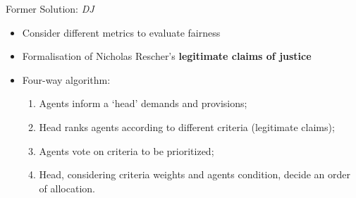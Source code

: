 \begin{frame}{Former Solution: \emph{DJ}}

\begin{itemize}
\item
  Consider different metrics to evaluate fairness
\item
  Formalisation of Nicholas Rescher's \textbf{legitimate claims of
  justice}
\end{itemize}

\columnsbegin


\begin{figure}
  \centering
\end{figure}


\begin{itemize}
\tightlist
\item
  Four-way algorithm:

  \begin{enumerate}
  \def\labelenumi{\arabic{enumi}.}
  \tightlist
  \item
    Agents inform a `head' demands and provisions;
  \item
    Head ranks agents according to different criteria (legitimate
    claims);
  \item
    Agents vote on criteria to be prioritized;
  \item
    Head, considering criteria weights and agents condition, decide an
    order of allocation.
  \end{enumerate}
\end{itemize}

\columnsend

\end{frame}

